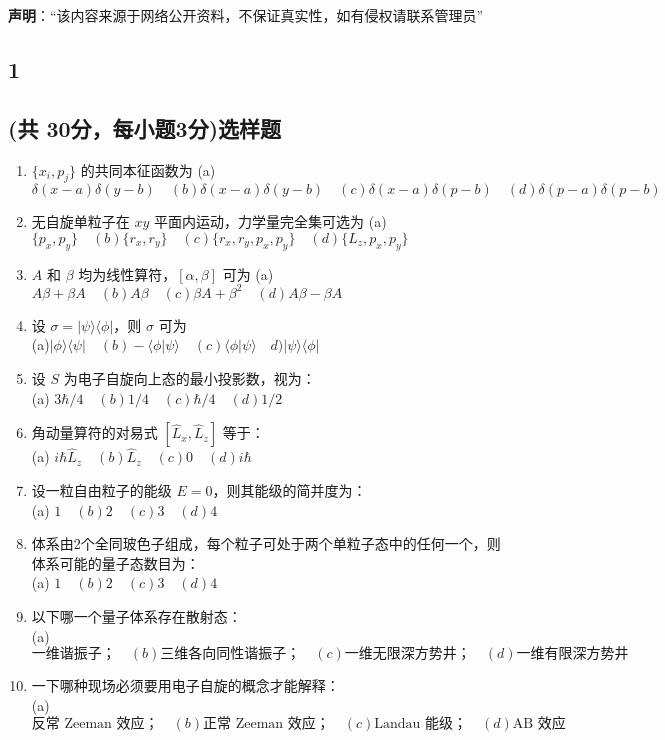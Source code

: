 
\textbf{声明}：“该内容来源于网络公开资料，不保证真实性，如有侵权请联系管理员”

\subsection{1}
\subsection{(共 30分，每小题3分)选样题}
\begin{enumerate}
    \item $\{x_i, p_j\}$ 的共同本征函数为 
(a) $\delta(x-a)\delta(y-b)\quad  (b) \delta(x-a)\delta(y-b) \quad (c) \delta(x-a)\delta(p-b) \quad (d) \delta(p-a)\delta(p-b)$
    \item 无自旋单粒子在 $xy$ 平面内运动，力学量完全集可选为 
(a) $\{p_x, p_y\} \quad (b) \{r_x, r_y\}\quad (c) \{r_x, r_y, p_x, p_y\}\quad (d) \{L_z, p_x, p_y\}$
    \item $A$ 和 $\beta$ 均为线性算符，$[\alpha, \beta]$ 可为 
(a) $A\beta + \beta A\quad (b) A\beta\quad (c) \beta A + \beta^2\quad (d) A\beta - \beta A$
    \item 设 $\sigma = |\psi\rangle \langle\phi|$，则 $\sigma$ 可为\\ 
(a)$|\phi\rangle \langle\psi| \quad (b) -\langle\phi|\psi\rangle \quad (c) \langle\phi|\psi\rangle\quad d) |\psi\rangle \langle\phi|$
     \item 设 $S$ 为电子自旋向上态的最小投影数，视为：\\
(a) $3\hbar/4 \quad (b) 1/4 \quad  (c) \hbar/4 \quad (d) 1/2 $
     \item 角动量算符的对易式 $[\hat{L}_x, \hat{L}_z]$ 等于：\\
(a) $i\hbar\hat{L}_z \quad (b) \hat{L}_z  \quad  (c) 0 \quad (d) i\hbar $
\item 设一粒自由粒子的能级 $ E = 0$，则其能级的简并度为：\\
(a) $1 \quad (b) 2  \quad  (c) 3 \quad (d) 4 $
\item 体系由2个全同玻色子组成，每个粒子可处于两个单粒子态中的任何一个，则体系可能的量子态数目为：\\
(a) $1 \quad (b) 2  \quad  (c) 3 \quad (d) 4 $
\item 以下哪一个量子体系存在散射态：\\
(a) $ \text{一维谐振子；} \quad (b) \text{三维各向同性谐振子；}  \quad  (c) \text{一维无限深方势井；} \quad (d)\text{一维有限深方势井} $
\item 一下哪种现场必须要用电子自旋的概念才能解释：\\
(a) $ \text{反常 Zeeman 效应；} \quad (b) \text{正常 Zeeman 效应；}  \quad  (c) \text{Landau 能级；} \quad (d)\text{AB 效应} $
\end{enumerate}

